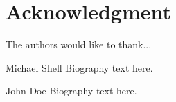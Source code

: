 \documentclass[journal]{IEEEtran}
\begin{document}
\section*{Acknowledgment}


The authors would like to thank...


\ifCLASSOPTIONcaptionsoff
  \newpage
\fi







%





% 

\begin{IEEEbiography}{Michael Shell}
Biography text here.
\end{IEEEbiography}

\begin{IEEEbiographynophoto}{John Doe}
Biography text here.
\end{IEEEbiographynophoto}
\end{document}
